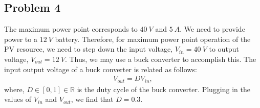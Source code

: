 \subsection*{Problem 4}
The maximum power point corresponds to $40\ V$ and $5\ A$. We need to provide power to a $12\ V$ battery. Therefore, for maximum power point operation of the PV resource, we need to step down the input voltage, $V_{in} = 40\ V$ to output voltage, $V_{out} = 12\ V$. Thus, we may use a buck converter to accomplish this. The input output voltage of a buck converter is related as follows:
\begin{align*}
	V_{out} = DV_{in},
\end{align*}
where, $D\in[0,1]\in \mathbb{R}$ is the duty cycle of the buck converter. Plugging in the values of $V_{in}$ and $V_{out}$, we find that $D=0.3$.

